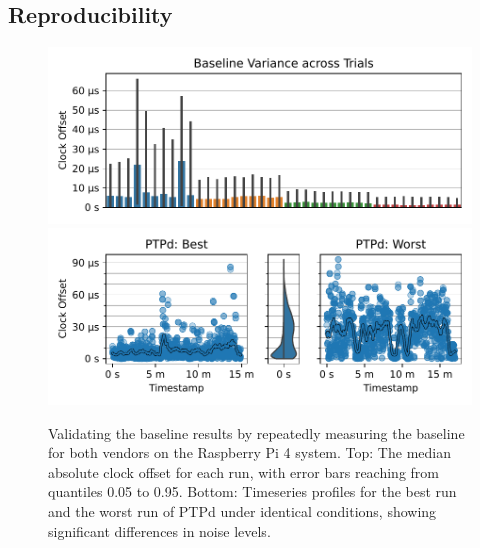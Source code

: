 \subsection{Reproducibility}

\begin{figure}
    \centering
    \includegraphics[width=\linewidth]{res/generated/base/key_metric_variance_rpi-4.pdf}
    \includegraphics[width=\linewidth]{res/generated/base/ptpd-good-vs-bad.pdf}

    \legend
    \caption{Validating the baseline results by repeatedly measuring the baseline for both vendors on the Raspberry Pi 4 system. Top: The median absolute clock offset for each run, with error bars reaching from quantiles 0.05 to 0.95. Bottom: Timeseries profiles for the best run and the worst run of PTPd under identical conditions, showing significant differences in noise levels.}
    \label{fig:baseline_reproducibility}
\end{figure}


